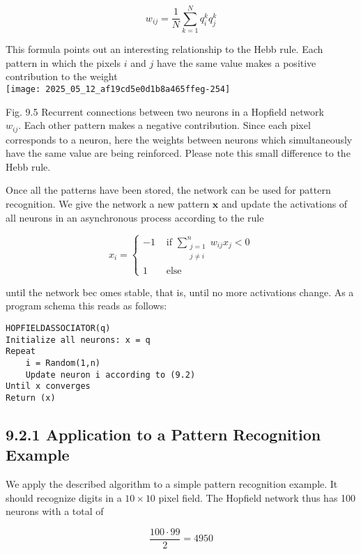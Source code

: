 \documentclass[10pt]{article}
\begin{document}
\begin{equation*}
w_{i j}=\frac{1}{N} \sum_{k=1}^{N} q_{i}^{k} q_{j}^{k} \tag{9.1}
\end{equation*}


This formula points out an interesting relationship to the Hebb rule. Each pattern in which the pixels $i$ and $j$ have the same value makes a positive contribution to the weight\\
\texttt{[image: 2025\_05\_12\_af19cd5e0d1b8a465ffeg-254]}

Fig. 9.5 Recurrent connections between two neurons in a Hopfield network\\
$w_{i j}$. Each other pattern makes a negative contribution. Since each pixel corresponds to a neuron, here the weights between neurons which simultaneously have the same value are being reinforced. Please note this small difference to the Hebb rule.

Once all the patterns have been stored, the network can be used for pattern recognition. We give the network a new pattern $\boldsymbol{x}$ and update the activations of all neurons in an asynchronous process according to the rule

\[
x_{i}= \begin{cases}-1 & \text { if } \sum_{\substack{j=1 \\ j \neq i}}^{n} w_{i j} x_{j}<0  \tag{9.2}\\ 1 & \text { else }\end{cases}
\]

until the network bec
omes stable, that is, until no more activations change. As a program schema this reads as follows:

\begin{verbatim}
HOPFIELDASSOCIATOR(q)
Initialize all neurons: x = q
Repeat
    i = Random(1,n)
    Update neuron i according to (9.2)
Until x converges
Return (x)
\end{verbatim}

\subsection*{9.2.1 Application to a Pattern Recognition Example}
We apply the described algorithm to a simple pattern recognition example. It should recognize digits in a $10 \times 10$ pixel field. The Hopfield network thus has 100 neurons with a total of

$$
\frac{100 \cdot 99}{2}=4950
$$
\end{document}
